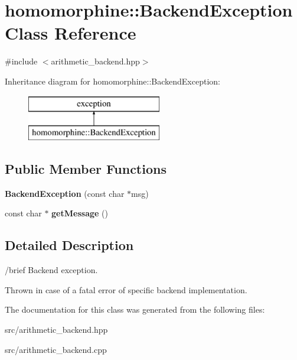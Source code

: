 \hypertarget{classhomomorphine_1_1_backend_exception}{}\section{homomorphine\+::Backend\+Exception Class Reference}
\label{classhomomorphine_1_1_backend_exception}


{\ttfamily \#include $<$arithmetic\+\_\+backend.\+hpp$>$}

Inheritance diagram for homomorphine\+::Backend\+Exception\+:\begin{figure}[H]
\begin{center}
\leavevmode
\includegraphics[height=2.000000cm]{classhomomorphine_1_1_backend_exception}
\end{center}
\end{figure}
\subsection*{Public Member Functions}
\begin{DoxyCompactItemize}
\item 
\mbox{\label{classhomomorphine_1_1_backend_exception_add89cd603a906324b3d9f899c71bab50}} 
{\bfseries Backend\+Exception} (const char $\ast$msg)
\item 
\mbox{\label{classhomomorphine_1_1_backend_exception_a5b6595c44ccf8e2196c7989f695d71a4}} 
const char $\ast$ {\bfseries get\+Message} ()
\end{DoxyCompactItemize}


\subsection{Detailed Description}
/brief Backend exception.

Thrown in case of a fatal error of specific backend implementation. 

The documentation for this class was generated from the following files\+:\begin{DoxyCompactItemize}
\item 
src/arithmetic\+\_\+backend.\+hpp\item 
src/arithmetic\+\_\+backend.\+cpp\end{DoxyCompactItemize}
